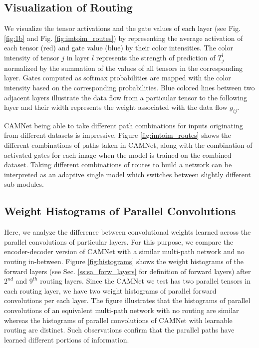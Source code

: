 \documentclass[10pt,twocolumn,letterpaper]{article}
\begin{document}
\subsection{Visualization of Routing}
\label{ss:visualization}
\vspace{-0.05in}
We visualize the tensor activations and the gate values of each layer (see Fig. \ref{fig:1b} and Fig. \ref{fig:imtoim_routes}) by representing the average activation of each tensor (red) and gate value (blue) by their color intensities. 
The color intensity of tensor $j$ in layer $l$ represents the strength of prediction of $T^l_j$  normalized by the summation of the values of all tensors in the corresponding layer. Gates computed as softmax probabilities are mapped with the color intensity based on the corresponding probabilities. Blue colored lines between two adjacent layers illustrate the data flow from a particular tensor to the following layer and their width represents the weight associated with the data flow $g_{ij}$.

CAMNet being able to take different path combinations for inputs originating from different datasets is impressive. Figure \ref{fig:imtoim_routes} shows the different combinations of paths taken in CAMNet, along with the combination of activated gates for each image when the model is trained on the combined dataset. Taking different combinations of routes to build a network can be interpreted as an adaptive single model which switches between slightly different sub-modules. 



\subsection{Weight Histograms of Parallel Convolutions}
\label{ss:weights}
\vspace{-0.05in}
Here, we analyze the difference between convolutional weights learned across the parallel convolutions of particular layers. For this purpose, we compare the encoder-decoder version of CAMNet with a similar multi-path network and no routing in-between. Figure \ref{fig:histograms} shows the weight histograms of the forward layers (see Sec. \ref{ss:sa_forw_layers} for definition of forward layers) after $2^{nd}$ and $9^{th}$ routing layers. Since the CAMNet we test has two parallel tensors in each routing layer, we have two weight histograms of parallel forward convolutions per each layer. The figure illustrates that the histograms of parallel convolutions of an equivalent multi-path network with no routing are similar whereas the histograms of parallel convolutions of CAMNet with learnable routing are distinct. Such observations confirm that the parallel paths have learned different portions of information. 
\end{document}
